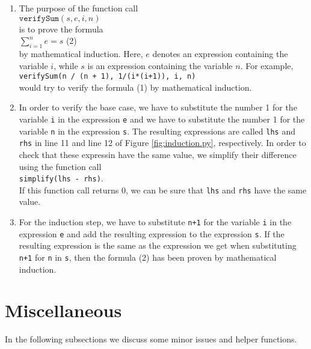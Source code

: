 \documentclass{report}
\begin{document}
\begin{enumerate}
\item The purpose of the function call
      \\[0.2cm]
      \hspace*{1.3cm}
      $\texttt{verifySum}(s, e, i, n)$
      \\[0.2cm]
      is to prove the formula
      \\[0.2cm]
      \hspace*{1.3cm}
      $\sum\limits_{i=1}^n e = s$  \hspace*{\fill} (2)
      \\[0.2cm]
      by mathematical induction.
      Here, $e$ denotes an expression containing the variable $i$, while $s$ is an expression containing
      the variable $n$.  For example, 
      \\[0.2cm]
      \hspace*{1.3cm}
      \texttt{verifySum(n / (n + 1), 1/(i*(i+1)), i, n)}
      \\[0.2cm]
      would try to verify the formula (1) by mathematical induction.
\item In order to verify the base case, we have to substitute the number 1 for the variable
      \texttt{i} in the expression \texttt{e} and we have to substitute the number 1 for the
      variable \texttt{n} in the expression \texttt{s}.  The resulting expressions are called
      \texttt{lhs} and \texttt{rhs} in line 11 and line 12 of Figure \ref{fig:induction.py}, respectively.
      In order to check that these expressin have the same value, we simplify their difference
      using the function call
      \\[0.2cm]
      \hspace*{1.3cm}
      \texttt{simplify(lhs - rhs)}.
      \\[0.2cm]
      If this function call returns 0, we can be sure that \texttt{lhs} and \texttt{rhs} have the
      same value.
\item For the induction step, we have to substitute \texttt{n+1} for the variable \texttt{i} in the
      expression \texttt{e} and add the resulting expression to the expression \texttt{s}.  If the
      resulting expression is the same as the expression we get when substituting \texttt{n+1} for
      \texttt{n} in \texttt{s}, then the formula (2) has been proven by mathematical induction.
\end{enumerate}

\section{Miscellaneous}
In the following subsections we discuss some minor issues and helper functions.
\end{document}

